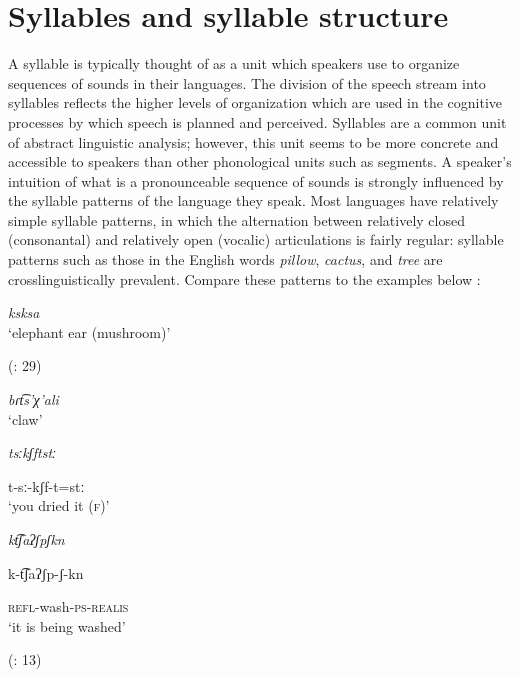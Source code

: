 \chapter{Syllables and syllable structure}\label{sec:1}

A syllable is typically thought of as a unit which speakers use to organize sequences of sounds in their languages. The division of the speech stream into syllables reflects the higher levels of organization which are used in the cognitive processes by which speech is planned and perceived. Syllables are a common unit of abstract linguistic analysis; however, this unit seems to be more concrete and accessible to speakers than other phonological units such as segments. A speaker’s intuition of what is a pronounceable sequence of sounds is strongly influenced by the syllable patterns of the language they speak. Most languages have relatively simple syllable patterns, in which the alternation between relatively closed (consonantal) and relatively open (vocalic) articulations is fairly regular: syllable patterns such as those in the English words \textit{pillow}, \textit{cactus}, and \textit{tree} are crosslinguistically prevalent. Compare these patterns to the examples below :

\ea\label{ex:1.1}

\textit{ksksa}\\
\glt ‘elephant ear (mushroom)’

(\citealt{HargusBeavert2006}: 29)
\z

\ea\label{ex:1.2}

\textit{bɾt͡s’χ’ali}\\
\glt ‘claw’
\citep[204]{Butskhrikidze2002}
\z

\ea\label{ex:1.3}

\textit{tsːkʃftstː}

t-sː-kʃf-t=stː\\
\glt ‘you dried it (\textsc{f})’
\citep[332]{Ridouane2008}
\z

\ea\label{ex:1.4}

\textit{kt͡ʃaʔʃpʃkn}

k-t͡ʃaʔʃp-ʃ-kn

\textsc{refl}-wash-\textsc{ps-realis}\\
\glt ‘it is being washed’

(\citealt{FernándezGarayHernández2006}: 13)
\z

